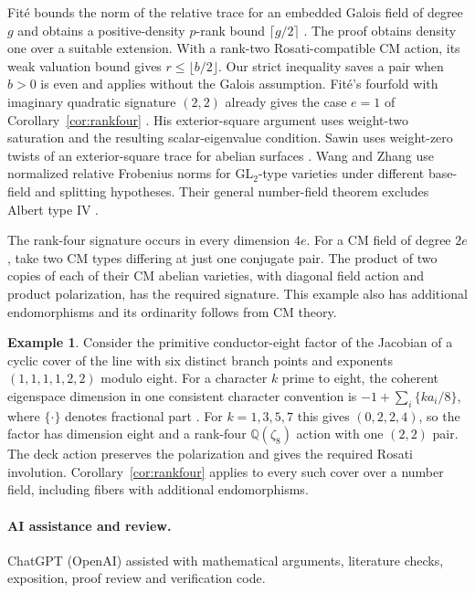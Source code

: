 \documentclass[11pt]{article}
\theoremstyle{definition}
\newtheorem{example}[theorem]{Example}
\newcommand{\Q}{\mathbb Q}
\begin{document}
Fit\'e bounds the norm of the relative trace for an embedded Galois
field of degree \(g\) and obtains a positive-density
\(p\)-rank bound \(\lceil g/2\rceil\)
\cite[Proposition~6 and Theorem~2]{fite}. The proof obtains density
one over a suitable extension. With a rank-two Rosati-compatible
CM action, its weak valuation bound gives
\(r\le\lfloor b/2\rfloor\). Our strict inequality saves a pair
when \(b>0\) is even and applies without the Galois assumption.
Fit\'e's fourfold with imaginary quadratic signature \((2,2)\)
already gives the case \(e=1\) of Corollary~\ref{cor:rankfour}
\cite[Theorem~4 and \S8]{fite}. His exterior-square argument
uses weight-two saturation and the resulting scalar-eigenvalue
condition. Sawin uses weight-zero twists of an exterior-square
trace for abelian surfaces \cite{sawin}. Wang and Zhang use
normalized relative Frobenius norms for GL\(_2\)-type varieties
under different base-field and splitting hypotheses. Their
general number-field theorem excludes Albert type IV
\cite[Theorems~1.1--1.3]{wangzhang}.

The rank-four signature occurs in every dimension \(4e\). For a CM
field of degree \(2e\), take two CM types differing at just one
conjugate pair. The product of two copies of each of their CM
abelian varieties, with diagonal field action and product
polarization, has the required signature. This example also has
additional endomorphisms and its ordinarity follows from CM theory.

\begin{example}
Consider the primitive conductor-eight factor of the Jacobian of
a cyclic cover of the line with six distinct branch points and
exponents \((1,1,1,1,2,2)\) modulo eight. For a character \(k\)
prime to eight, the coherent eigenspace dimension in one consistent
character convention is \(-1+\sum_i\{ka_i/8\}\), where
\(\{\cdot\}\) denotes fractional part
\cite[\S2]{moonen}. For \(k=1,3,5,7\) this gives
\((0,2,2,4)\), so the factor has dimension eight and a rank-four
\(\Q(\zeta_8)\) action with one \((2,2)\) pair. The deck action
preserves the polarization and gives the required Rosati involution.
Corollary~\ref{cor:rankfour} applies to every such cover over a
number field, including fibers with additional endomorphisms.
\end{example}

\appendix



\paragraph{AI assistance and review.}
ChatGPT (OpenAI) assisted with mathematical arguments, literature checks,
exposition, proof review and verification code.
\end{document}

